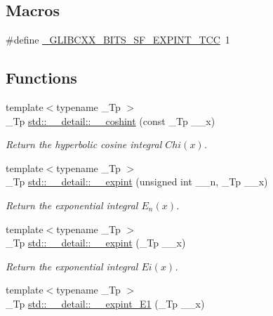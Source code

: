 \subsection*{Macros}
\begin{DoxyCompactItemize}
\item 
\#define \hyperlink{sf__expint_8tcc_a1dd7ac46e3e1d856c4d1abb21192f01a}{\+\_\+\+G\+L\+I\+B\+C\+X\+X\+\_\+\+B\+I\+T\+S\+\_\+\+S\+F\+\_\+\+E\+X\+P\+I\+N\+T\+\_\+\+T\+CC}~1
\end{DoxyCompactItemize}
\subsection*{Functions}
\begin{DoxyCompactItemize}
\item 
{\footnotesize template$<$typename \+\_\+\+Tp $>$ }\\\+\_\+\+Tp \hyperlink{namespacestd_1_1____detail_ad48a89a591f7b58a047f072e6e383663}{std\+::\+\_\+\+\_\+detail\+::\+\_\+\+\_\+coshint} (const \+\_\+\+Tp \+\_\+\+\_\+x)
\begin{DoxyCompactList}\small\item\em Return the hyperbolic cosine integral $ Chi(x) $. \end{DoxyCompactList}\item 
{\footnotesize template$<$typename \+\_\+\+Tp $>$ }\\\+\_\+\+Tp \hyperlink{namespacestd_1_1____detail_a0282700710ec07b8ca095fe2ec140d6e}{std\+::\+\_\+\+\_\+detail\+::\+\_\+\+\_\+expint} (unsigned int \+\_\+\+\_\+n, \+\_\+\+Tp \+\_\+\+\_\+x)
\begin{DoxyCompactList}\small\item\em Return the exponential integral $ E_n(x) $. \end{DoxyCompactList}\item 
{\footnotesize template$<$typename \+\_\+\+Tp $>$ }\\\+\_\+\+Tp \hyperlink{namespacestd_1_1____detail_abefd4102ce8a673604204e360074ceaa}{std\+::\+\_\+\+\_\+detail\+::\+\_\+\+\_\+expint} (\+\_\+\+Tp \+\_\+\+\_\+x)
\begin{DoxyCompactList}\small\item\em Return the exponential integral $ Ei(x) $. \end{DoxyCompactList}\item 
{\footnotesize template$<$typename \+\_\+\+Tp $>$ }\\\+\_\+\+Tp \hyperlink{namespacestd_1_1____detail_a665eb0c524b929c035d88bbb17815917}{std\+::\+\_\+\+\_\+detail\+::\+\_\+\+\_\+expint\+\_\+\+E1} (\+\_\+\+Tp \+\_\+\+\_\+x)

\end{DoxyCompactItemize}
